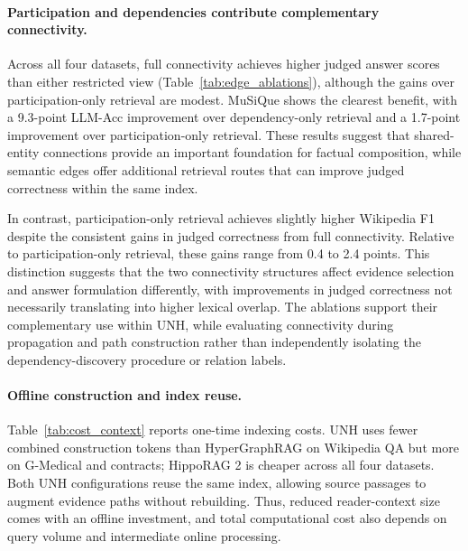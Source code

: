 \documentclass[sigconf, review, anonymous]{acmart}
\newcommand{\sys}{UNH}
\begin{document}
\paragraph{Participation and dependencies contribute complementary connectivity.}
\label{sec:ablations}

Across all four datasets, full connectivity achieves higher judged answer scores than either restricted view (Table~\ref{tab:edge_ablations}), although the gains over participation-only retrieval are modest. MuSiQue shows the clearest benefit, with a 9.3-point LLM-Acc improvement over dependency-only retrieval and a 1.7-point improvement over participation-only retrieval. These results suggest that shared-entity connections provide an important foundation for factual composition, while semantic edges offer additional retrieval routes that can improve judged correctness within the same index.

In contrast, participation-only retrieval achieves slightly higher Wikipedia F1 despite the consistent gains in judged correctness from full connectivity. Relative to participation-only retrieval, these gains range from 0.4 to 2.4 points. This distinction suggests that the two connectivity structures affect evidence selection and answer formulation differently, with improvements in judged correctness not necessarily translating into higher lexical overlap. The ablations support their complementary use within \sys{}, while evaluating connectivity during propagation and path construction rather than independently isolating the dependency-discovery procedure or relation labels.

\paragraph{Offline construction and index reuse.}
\label{sec:efficiency}
 Table~\ref{tab:cost_context} reports one-time indexing costs. \sys{} uses fewer combined construction tokens than HyperGraphRAG on Wikipedia QA but more on G-Medical and contracts; HippoRAG 2 is cheaper across all four datasets. Both \sys{} configurations reuse the same index, allowing source passages to augment evidence paths without rebuilding. Thus, reduced reader-context size comes with an offline investment, and total computational cost also depends on query volume and intermediate online processing.
\end{document}
